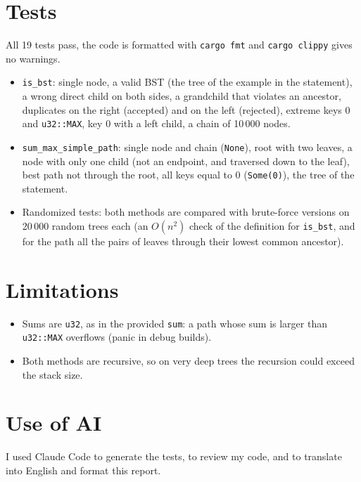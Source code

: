 \documentclass[11pt,a4paper]{article}
\begin{document}
\section*{Tests}

All 19 tests pass, the code is formatted with \texttt{cargo fmt} and \texttt{cargo clippy} gives no warnings.
\begin{itemize}
\item \texttt{is\_bst}: single node, a valid BST (the tree of the example in the statement), a wrong direct
child on both sides, a grandchild that violates an ancestor, duplicates on the right (accepted) and on the
left (rejected), extreme keys 0 and \texttt{u32::MAX}, key 0 with a left child, a chain of 10\,000 nodes.
\item \texttt{sum\_max\_simple\_path}: single node and chain (\texttt{None}), root with two leaves, a node
with only one child (not an endpoint, and traversed down to the leaf), best path not through the root,
all keys equal to 0 (\texttt{Some(0)}), the tree of the statement.
\item Randomized tests: both methods are compared with brute-force versions on 20\,000 random trees each
(an $O(n^2)$ check of the definition for \texttt{is\_bst}, and for the path all the pairs of leaves through
their lowest common ancestor).
\end{itemize}

\section*{Limitations}
\begin{itemize}
\item Sums are \texttt{u32}, as in the provided \texttt{sum}: a path whose sum is larger than
\texttt{u32::MAX} overflows (panic in debug builds).
\item Both methods are recursive, so on very deep trees the recursion could exceed the stack size.
\end{itemize}

\section*{Use of AI}
I used Claude Code to generate the tests, to review my code, and to translate into English and format this report.
\end{document}
